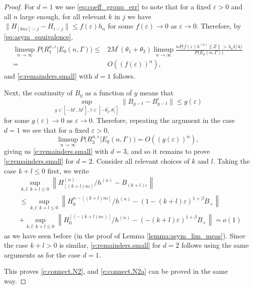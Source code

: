 \documentclass[11pt,reqno]{amsart}
\numberwithin{equation}{section}
\theoremstyle{definition}
\theoremstyle{remark}
\theoremstyle{definition}
\newcommand{\eps}{\varepsilon}
\begin{document}
\begin{proof}
For $d=1$ we use \eqref{eq:coeff_group_err} to note that for a fixed
$\eps>0$ and all $n$ large enough, for all relevant $k$ in $j$ we have 
  $\| H_{[kn\eps]-j}-H_{i-j}\| \leq f(\eps) h_n $ for  some $f(\eps)
  \to 0$ as $\eps \to 0$.  Therefore, by \eqref{eq:asym_equivalence}, 
 \begin{align*}
\limsup_{n\to\infty} P\bigl( R_1^{n,
                    \eps}\big|E_0(n,\Gamma)\bigr) 
\leq& 2M^\prime (\theta_1+\theta_2)\limsup_{n\to\infty}  \frac{nP\bigl(f(\eps) h^{(n)} \|Z\|
    > \lambda_n \delta/4\bigr)}{P\bigl( E_0(n,\Gamma)\bigr)} \\
=&O((f(\eps))^\alpha),
  \end{align*}
and   \eqref{e:remainders.small} with $d=1$ follows. 

Next, the continuity of $B_y$ as a function of $y$ means that
$$
\sup_{y\in [-M^\prime,M^\prime], \, t \in [-\theta_2^\prime,
  \theta_1^\prime]} \|B_{y-t} - B_{y - t}^\eps\| \leq g(\eps)
$$
 for some $g(\eps)\to 0$ as $\eps\to 0$. Therefore, repeating the
 argument in the case $d=1$ we see that for a fixed $\eps>0$,
 $$
 \limsup_{n\to\infty} P\bigl( R_3^{n,
                    \eps}\big|E_0(n,\Gamma)\bigr) = O((g(\eps))^\alpha),
                  $$
giving us \eqref{e:remainders.small} with $d=3$, and so it remains to
prove \eqref{e:remainders.small} for $d=2$. Consider all relevant
choices of $k$ and $l$. Taking the case $k+l\leq 0$ first, we write 
\begin{align*}
     & \sup_{k,l:\, k+l\leq 0}\left\|H_{[(k+l)n\eps]}^{(n)}/h^{(n)}-
       B_{(k+l)\eps}\right\| \\
&\leq  \sup_{k,l:\, k+l\leq 0} \left\|H_0^{n-[(k+l)n\eps]} /h^{(n)}- (1-(k+l)\eps)^{1+\beta}B_+ \right\|  \\
     & +  \sup_{k,l:\, k+l\leq 0} \left\|H_0^{[(-(k+l) n\eps)]}/h^{(n)}
     - (-(k+l)\eps)^{1+\beta} B_+ \right\| =   o(1)
\end{align*}
as we have seen before (in the proof of Lemma
\ref{lemma:asym_lim_meas}). Since the case $k+l>0$ is similar, 
 \eqref{e:remainders.small} for $d=2$ follows using the same arguments
 as for the case $d=1$. 

 This proves \eqref{e:connect.N2}, and \eqref{e:connect.N2a} can be
 proved in the same way. 
\end{proof}
\end{document}
